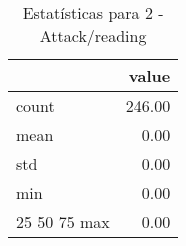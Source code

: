 \begin{table}[htbp]
\caption{Estatísticas para 2 - Attack/reading}
\label{tab:2_-_attack_reading_summary}
\begin{tabular}{lr}
\toprule
 & value \\
\midrule
count & 246.00 \\
mean & 0.00 \\
std & 0.00 \\
min & 0.00 \\
25%
50%
75%
max & 0.00 \\
\bottomrule
\end{tabular}
\end{table}
